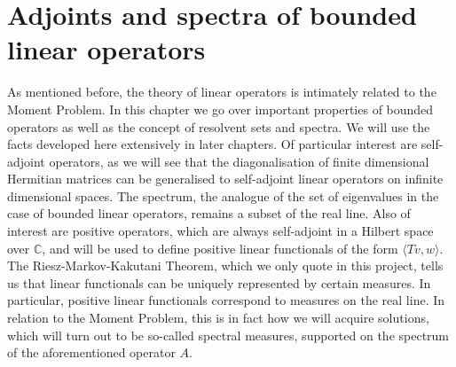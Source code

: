 \documentclass[12pt,oneside]{report}
\begin{document}





\chapter{Adjoints and spectra of bounded linear operators}

As mentioned before, the theory of linear operators is intimately related to the Moment Problem. In this chapter we go over important properties of bounded operators as well as the concept of resolvent sets and spectra. We will use the facts developed here extensively in later chapters. Of particular interest are self-adjoint operators, as we will see that the diagonalisation of finite dimensional Hermitian matrices can be generalised to self-adjoint linear operators on infinite dimensional spaces. The spectrum, the analogue of the set of eigenvalues in the case of bounded linear operators, remains a subset of the real line. Also of interest are positive operators, which are always self-adjoint in a Hilbert space over $\mathbb{C}$, and will be used to define positive linear functionals of the form $\langle Tv, w \rangle$. The Riesz-Markov-Kakutani Theorem, which we only quote in this project, tells us that linear functionals can be uniquely represented by certain measures. In particular, positive linear functionals correspond to measures on the real line. In relation to the Moment Problem, this is in fact how we will acquire solutions, which will turn out to be so-called spectral measures, supported on the spectrum of the aforementioned operator $A$.
\end{document}
